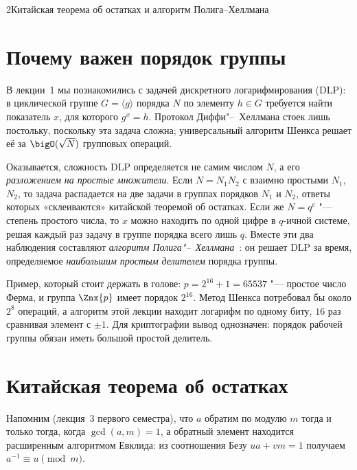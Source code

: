 \begin{lecture}{2}{Китайская теорема об остатках и алгоритм Полига–Хеллмана}

\section{Почему важен порядок группы}

В лекции~1 мы познакомились с задачей дискретного логарифмирования (DLP): в циклической группе
$G = \langle g \rangle$ порядка $N$ по элементу $h \in G$ требуется найти показатель $x$, для
которого $g^x = h$. Протокол Диффи"--~Хеллмана стоек лишь постольку, поскольку эта задача сложна;
универсальный алгоритм Шенкса решает её за $\bigO(\sqrt N)$ групповых операций.

Оказывается, сложность DLP определяется не самим числом $N$, а его \emph{разложением на простые
множители}. Если $N = N_1 N_2$ с взаимно простыми $N_1$, $N_2$, то задача распадается на две
задачи в группах порядков $N_1$ и $N_2$, ответы которых «склеиваются» китайской теоремой об
остатках. Если же $N = q^e$ "--- степень простого числа, то $x$ можно находить по одной цифре
в $q$-ичной системе, решая каждый раз задачу в группе порядка всего лишь $q$. Вместе эти два
наблюдения составляют \emph{алгоритм Полига"--~Хеллмана}~\cite{pohlig-hellman}: он решает DLP
за время, определяемое \emph{наибольшим простым делителем} порядка группы.

Пример, который стоит держать в голове: $p = 2^{16} + 1 = 65537$ "--- простое число Ферма, и
группа $\Znx{p}$ имеет порядок $2^{16}$. Метод Шенкса потребовал бы около $2^8$ операций, а
алгоритм этой лекции находит логарифм по одному биту, $16$ раз сравнивая элемент с $\pm 1$.
Для криптографии вывод однозначен: порядок рабочей группы обязан иметь большой простой делитель.

\section{Китайская теорема об остатках}

Напомним (лекция~3 первого семестра), что $a$ обратим по модулю $m$ тогда и только тогда,
когда $\gcd(a, m) = 1$, а обратный элемент находится расширенным алгоритмом Евклида: из
соотношения Безу $ua + vm = 1$ получаем $a^{-1} \equiv u \pmod m$.


\end{lecture}
